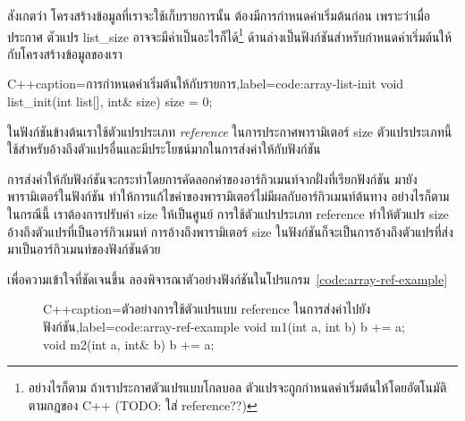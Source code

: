 สังเกต{\wbr}ว่า โครงสร้าง{\wbr}ข้อมูล{\wbr}ที่{\wbr}เรา{\wbr}จะ{\wbr}ใช้{\wbr}เก็บ{\wbr}รายการ{\wbr}นั้น ต้อง{\wbr}มี{\wbr}การ{\wbr}กำหนด{\wbr}ค่า{\wbr}เริ่มต้น{\wbr}ก่อน{\wbr}
เพราะว่า{\wbr}เมื่อ{\wbr}ประกาศ ตัวแปร {\ct list\_size}
อาจ{\wbr}จะ{\wbr}มี{\wbr}ค่า{\wbr}เป็น{\wbr}อะไร{\wbr}ก็ได้\footnote{อย่างไรก็ตาม ถ้า{\wbr}เรา{\wbr}ประกาศ{\wbr}ตัวแปร{\wbr}แบบ{\wbr}โก{\wbr}ลบ{\wbr}อล
  ตัวแปร{\wbr}จะ{\wbr}ถูก{\wbr}กำหนด{\wbr}ค่า{\wbr}เริ่มต้น{\wbr}ให้{\wbr}โดย{\wbr}อัตโนมัติ{\wbr}ตาม{\wbr}กฎ{\wbr}ของ C++ (TODO: ใส่ reference??)}
ด้าน{\wbr}ล่าง{\wbr}เป็น{\wbr}ฟังก์ชัน{\wbr}สำหรับ{\wbr}กำหนด{\wbr}ค่า{\wbr}เริ่มต้น{\wbr}ให้{\wbr}กับ{\wbr}โครงสร้าง{\wbr}ข้อมูล{\wbr}ของ{\wbr}เรา{\wbr}

\latintext
\begin{codelist}{C++}{caption={\thaitext การ{\wbr}กำหนด{\wbr}ค่า{\wbr}เริ่มต้น{\wbr}ให้{\wbr}กับ{\wbr}รายการ\latintext},label=code:array-list-init}
void list_init(int list[], int& size)
{
  size = 0;
}
\end{codelist}
\thaitext

ใน{\wbr}ฟังก์ชัน{\wbr}ข้างต้น{\wbr}เรา{\wbr}ใช้{\wbr}ตัวแปร{\wbr}ประเภท {\em reference} ใน{\wbr}การ{\wbr}ประกาศ{\wbr}พารามิเตอร์ {\ct
size} ตัวแปร{\wbr}ประเภท{\wbr}นี้{\wbr}ใช้{\wbr}สำหรับ{\wbr}อ้าง{\wbr}ถึง{\wbr}ตัวแปร{\wbr}อื่น{\wbr}และ{\wbr}มี{\wbr}ประโยชน์{\wbr}มาก{\wbr}ใน{\wbr}การ{\wbr}ส่ง{\wbr}ค่า{\wbr}ให้{\wbr}กับ{\wbr}ฟังก์ชัน{\wbr}

การ{\wbr}ส่ง{\wbr}ค่า{\wbr}ให้{\wbr}กับ{\wbr}ฟังก์ชัน{\wbr}จะ{\wbr}กระทำ{\wbr}โดย{\wbr}การ{\wbr}คัดลอก{\wbr}ค่า{\wbr}ของ{\wbr}อาร์กิวเมนท์{\wbr}จาก{\wbr}ฝั่ง{\wbr}ที่{\wbr}เรียก{\wbr}ฟังก์ชัน{\wbr}
มา{\wbr}ยัง{\wbr}พารามิเตอร์{\wbr}ใน{\wbr}ฟังก์ชัน ทำ{\wbr}ให้การ{\wbr}แก้ไข{\wbr}ค่า{\wbr}ของ{\wbr}พารามิเตอร์{\wbr}ไม่{\wbr}มี{\wbr}ผล{\wbr}กับ{\wbr}อาร์กิวเมนท์{\wbr}ต้นทาง{\wbr}
อย่างไรก็ตาม{\wbr}ใน{\wbr}กรณี{\wbr}นี้ เรา{\wbr}ต้องการ{\wbr}ปรับ{\wbr}ค่า {\ct size} ให้{\wbr}เป็น{\wbr}ศูนย์ การ{\wbr}ใช้{\wbr}ตัวแปร{\wbr}ประเภท{\wbr}
reference ทำ{\wbr}ให้{\wbr}ตัวแปร {\ct size} อ้าง{\wbr}ถึง{\wbr}ตัวแปร{\wbr}ที่{\wbr}เป็น{\wbr}อาร์กิวเมนท์
การ{\wbr}อ้าง{\wbr}ถึง{\wbr}พารามิเตอร์ {\ct size}
ใน{\wbr}ฟังก์ชัน{\wbr}ก็{\wbr}จะ{\wbr}เป็น{\wbr}การ{\wbr}อ้าง{\wbr}ถึง{\wbr}ตัวแปร{\wbr}ที่{\wbr}ส่ง{\wbr}มา{\wbr}เป็น{\wbr}อาร์กิวเมนท์{\wbr}ของ{\wbr}ฟังก์ชัน{\wbr}ด้วย{\wbr}

เพื่อ{\wbr}ความ{\wbr}เข้าใจ{\wbr}ที่{\wbr}ชัดเจน{\wbr}ขึ้น{\wbr}
ลอง{\wbr}พิจารณา{\wbr}ตัวอย่าง{\wbr}ฟังก์ชัน{\wbr}ใน{\wbr}โปรแกรม~\ref{code:array-ref-example}

\begin{figure}
\latintext
\begin{codelist}{C++}{caption={\thaitext ตัวอย่าง{\wbr}การ{\wbr}ใช้{\wbr}ตัวแปร{\wbr}แบบ reference ใน{\wbr}การ{\wbr}ส่ง{\wbr}ค่า{\wbr}ไป{\wbr}ยัง{\wbr}ฟังก์ชัน\latintext},label=code:array-ref-example}
void m1(int a, int b)
{
  b += a;
}
void m2(int a, int& b)
{
  b += a;
}
\end{codelist}
\thaitext
\end{figure}

